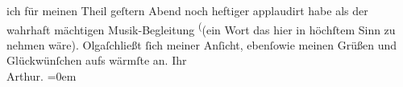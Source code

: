 \begin{ledgroupsized}[t]{13cm}
               ich für meinen Theil geſtern \introOben{}Abend\introOben{} noch
               heftiger applaudirt habe als der wahrhaft
               mächtigen Musik-Begleitung \substVorne{}\textsuperscript{(}\substDazwischen{}(ein Wort\substHinten{} das hier in höchſtem Sinn zu nehmen wäre).\pend
           \pstart
           Olgaſchließt ſich meiner Anſicht, ebenſowie meinen
               Grüßen und Glückwünſchen aufs wärmſte an.\pend
           \pstart
           Ihr{\\[\baselineskip]}\spacefill\mbox{Arthur.}\pend
           \leftskip=0em{}\endnumbering{}\end{ledgroupsized}  \newcommand{\dateiname}{L01834}\newcommand{\titel}{Arthur Schnitzler an Hugo von Hofmannsthal, 25. 3. 1909}\newcommand{\editorInnen}{Martin Anton Müller und Gerd-Hermann Susen}
      